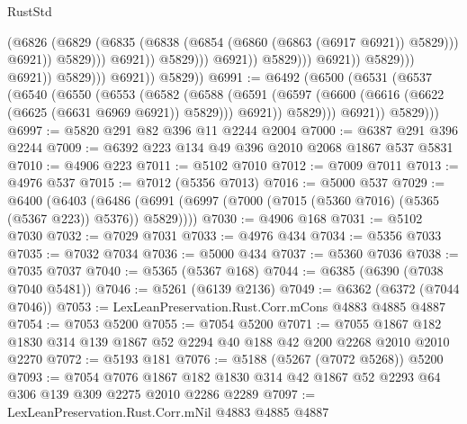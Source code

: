 \begin{lexlean}{RustStd}
\begin{coremodule}
                                                        (@6826
                                                          (@6829
                                                            (@6835
                                                              (@6838
                                                                (@6854
                                                                  (@6860
                                                                    (@6863 (@6917 @6921))
                                                                    @5829)))
                                                              @6921))
                                                          @5829)))
                                                    @6921))
                                                @5829)))
                                          @6921))
                                      @5829)))
                                @6921))
                            @5829)))
                      @6921))
                  @5829)))
            @6921))
        @5829))
@6991 := @6492
    (@6500
      (@6531
        (@6537
          (@6540
            (@6550
              (@6553
                (@6582
                  (@6588
                    (@6591 (@6597 (@6600 (@6616 (@6622 (@6625 (@6631 @6969 @6921)) @5829))) @6921))
                    @5829)))
              @6921))
          @5829)))
@6997 := @5820 @291 @82 @396 @11 @2244 @2004
@7000 := @6387 @291 @396 @2244
@7009 := @6392 @223 @134 @49 @396 @2010 @2068 @1867 @537 @5831
@7010 := @4906 @223
@7011 := @5102 @7010
@7012 := @7009 @7011
@7013 := @4976 @537
@7015 := @7012 (@5356 @7013)
@7016 := @5000 @537
@7029 := @6400
    (@6403 (@6486 (@6991 (@6997 (@7000 (@7015 (@5360 @7016) (@5365 (@5367 @223)) @5376)) @5829))))
@7030 := @4906 @168
@7031 := @5102 @7030
@7032 := @7029 @7031
@7033 := @4976 @434
@7034 := @5356 @7033
@7035 := @7032 @7034
@7036 := @5000 @434
@7037 := @5360 @7036
@7038 := @7035 @7037
@7040 := @5365 (@5367 @168)
@7044 := @6385 (@6390 (@7038 @7040 @5481))
@7046 := @5261 (@6139 @2136)
@7049 := @6362 (@6372 (@7044 @7046))
@7053 := LexLeanPreservation.Rust.Corr.mCons @4883 @4885 @4887
@7054 := @7053 @5200
@7055 := @7054 @5200
@7071 := @7055 @1867 @182 @1830 @314 @139 @1867 @52 @2294 @40 @188 @42 @200 @2268 @2010 @2010 @2270
@7072 := @5193 @181
@7076 := @5188 (@5267 (@7072 @5268)) @5200
@7093 := @7054
    @7076
    @1867
    @182
    @1830
    @314
    @42
    @1867
    @52
    @2293
    @64
    @306
    @139
    @309
    @2275
    @2010
    @2286
    @2289
@7097 := LexLeanPreservation.Rust.Corr.mNil @4883 @4885 @4887

\end{coremodule}
\end{lexlean}
